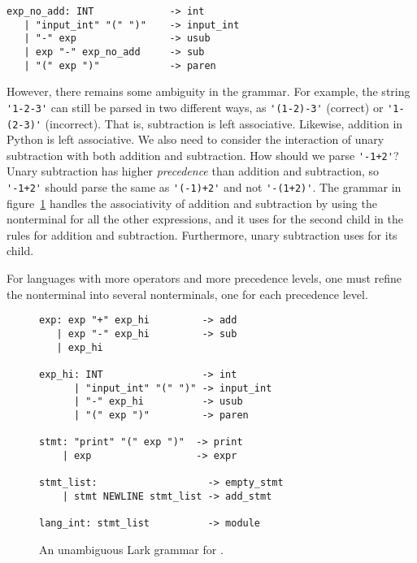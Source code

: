 \documentclass[7x10]{TimesAPriori_MIT}%
\numberwithin{theorem}{chapter}
\numberwithin{definition}{chapter}
\numberwithin{equation}{chapter}
\begin{document}
{\begin{center}
\begin{minipage}{0.95\textwidth}
\begin{lstlisting}[escapechar=$]
exp_no_add: INT             -> int
   | "input_int" "(" ")"    -> input_int
   | "-" exp                -> usub
   | exp "-" exp_no_add     -> sub
   | "(" exp ")"            -> paren
\end{lstlisting}
\end{minipage}
\end{center}

However, there remains some ambiguity in the grammar. For example, the
string \lstinline{'1-2-3'} can still be parsed in two different ways,
as \lstinline{'(1-2)-3'} (correct) or \lstinline{'1-(2-3)'}
(incorrect).  That is, subtraction is left associative. Likewise,
addition in Python is left associative. We also need to consider the
interaction of unary subtraction with both addition and
subtraction. How should we parse \lstinline{'-1+2'}? Unary subtraction
has higher \emph{precedence} than addition
and subtraction, so \lstinline{'-1+2'} should parse the same as
\lstinline{'(-1)+2'} and not \lstinline{'-(1+2)'}. The grammar in
figure~\ref{fig:Lint-lark-grammar} handles the associativity of
addition and subtraction by using the nonterminal  for
all the other expressions, and it uses  for the second
child in the rules for addition and subtraction. Furthermore, unary
subtraction uses  for its child.

For languages with more operators and more precedence levels, one must
refine the  nonterminal into several nonterminals, one for
each precedence level.

\begin{figure}[tbp]
\begin{tcolorbox}[colback=white]
\centering
\begin{lstlisting}[escapechar=$]
exp: exp "+" exp_hi         -> add
   | exp "-" exp_hi         -> sub
   | exp_hi

exp_hi: INT                 -> int
      | "input_int" "(" ")" -> input_int
      | "-" exp_hi          -> usub
      | "(" exp ")"         -> paren

stmt: "print" "(" exp ")"  -> print
    | exp                  -> expr

stmt_list:                   -> empty_stmt
    | stmt NEWLINE stmt_list -> add_stmt

lang_int: stmt_list          -> module
\end{lstlisting}
\end{tcolorbox}
\caption{An unambiguous Lark grammar for \LangInt{}.}
\label{fig:Lint-lark-grammar}
\end{figure}

}
\end{document}
